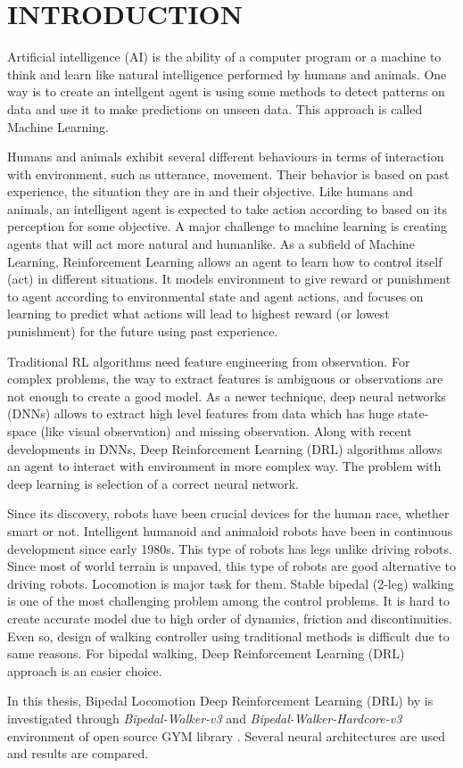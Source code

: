 \chapter{INTRODUCTION}
\label{chap:intro}

Artificial intelligence (AI) is the ability of a computer program or a machine to think and learn like natural intelligence performed by humans and animals.  One way is to create an intellgent agent is using some methods to detect patterns on data and use it to make predictions on unseen data. This approach is called Machine Learning. 

Humans and animals exhibit several different behaviours in terms of interaction with environment, such as utterance, movement. Their behavior is based on past experience, the situation they are in and their objective. Like humans and animals, an intelligent agent is expected to take action according to based on its perception for some objective. A major challenge to machine learning is creating agents that will act more natural and humanlike. As a subfield of Machine Learning, Reinforcement Learning allows an agent to learn how to control itself (act) in different situations. It models environment to give reward or punishment to agent according to environmental state and agent actions, and focuses on learning to predict what actions will lead to highest reward (or lowest punishment) for the future using past experience.

Traditional RL algorithms need feature engineering from observation. For complex problems, the way to extract features is ambiguous or observations are not enough to create a good model. As a newer technique, deep neural networks (DNNs) allows to extract high level features from data which has huge state-space (like visual observation) and missing observation. Along with recent developments in DNNs, Deep Reinforcement Learning (DRL) algorithms allows an agent to interact with environment in more complex way. The problem with deep learning is selection of a correct neural network. 

Since its discovery, robots have been crucial devices for the human race, whether smart or not. Intelligent humanoid and animaloid robots have been in continuous development since early 1980s. This type of robots has legs unlike driving robots. Since most of world terrain is unpaved, this type of robots are good alternative to driving robots. Locomotion is major task for them. Stable bipedal (2-leg) walking is one of the most challenging problem among the control problems. It is hard to create accurate model due to high order of dynamics, friction and discontinuities. Even so, design of walking controller using traditional methods is difficult due to same reasons. For bipedal walking, Deep Reinforcement Learning (DRL) approach is an easier choice.

In this thesis, Bipedal Locomotion Deep Reinforcement Learning (DRL) by is investigated through \textit{Bipedal-Walker-v3} \cite{noauthor_bipedalwalker-v2_2021} and \textit{Bipedal-Walker-Hardcore-v3} \cite{noauthor_bipedalwalkerhardcore-v2_2021} environment of open source GYM library \cite{brockman_openai_2016}. Several neural architectures are used and results are compared. 